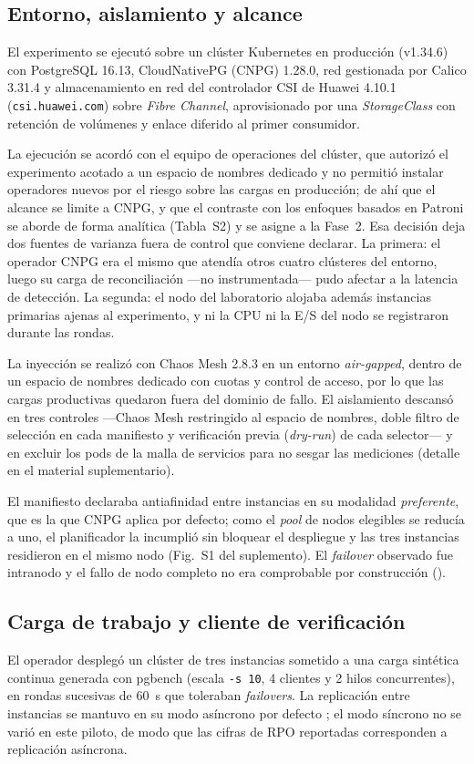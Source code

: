 \subsection{Entorno, aislamiento y alcance}\label{sec:entorno}
El experimento se ejecutó sobre un clúster Kubernetes en producción (v1.34.6) con PostgreSQL 16.13, CloudNativePG (CNPG) 1.28.0, red gestionada por Calico 3.31.4 y almacenamiento en red del controlador CSI de Huawei 4.10.1 (\texttt{csi.huawei.com}) sobre \textit{Fibre Channel}, aprovisionado por una \textit{StorageClass} con retención de volúmenes y enlace diferido al primer consumidor.

La ejecución se acordó con el equipo de operaciones del clúster, que autorizó el experimento acotado a un espacio de nombres dedicado y no permitió instalar operadores nuevos por el riesgo sobre las cargas en producción; de ahí que el alcance se limite a CNPG, y que el contraste con los enfoques basados en Patroni se aborde de forma analítica (Tabla~S2) y se asigne a la Fase~2. Esa decisión deja dos fuentes de varianza fuera de control que conviene declarar. La primera: el operador CNPG era el mismo que atendía otros cuatro clústeres del entorno, luego su carga de reconciliación —no instrumentada— pudo afectar a la latencia de detección. La segunda: el nodo del laboratorio alojaba además instancias primarias ajenas al experimento, y ni la CPU ni la E/S del nodo se registraron durante las rondas.

La inyección se realizó con Chaos Mesh 2.8.3 en un entorno \textit{air-gapped}, dentro de un espacio de nombres dedicado con cuotas y control de acceso, por lo que las cargas productivas quedaron fuera del dominio de fallo. El aislamiento descansó en tres controles —Chaos Mesh restringido al espacio de nombres, doble filtro de selección en cada manifiesto y verificación previa (\textit{dry-run}) de cada selector— y en excluir los pods de la malla de servicios para no sesgar las mediciones (detalle en el material suplementario).

El manifiesto declaraba antiafinidad entre instancias en su modalidad \emph{preferente}, que es la que CNPG aplica por defecto; como el \textit{pool} de nodos elegibles se reducía a uno, el planificador la incumplió sin bloquear el despliegue y las tres instancias residieron en el mismo nodo (Fig.~S1 del suplemento). El \textit{failover} observado fue intranodo y el fallo de nodo completo no era comprobable por construcción ().


\subsection{Carga de trabajo y cliente de verificación}\label{sec:carga}
El operador desplegó un clúster de tres instancias sometido a una carga sintética continua generada con pgbench (escala \texttt{-s 10}, 4 clientes y 2 hilos concurrentes), en rondas sucesivas de 60~s que toleraban \textit{failovers}. La replicación entre instancias se mantuvo en su modo asíncrono por defecto \citep{postgresql2024}; el modo síncrono no se varió en este piloto, de modo que las cifras de RPO reportadas corresponden a replicación asíncrona.

